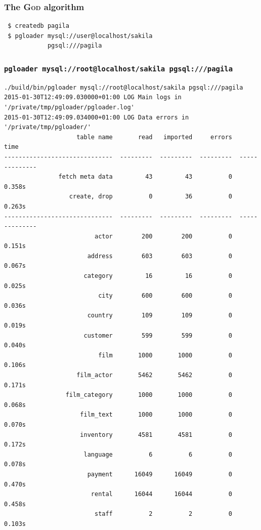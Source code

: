 \documentclass{beamer}
\begin{document}
\begin{frame}[fragile]
  \frametitle{The \textsc{God} algorithm}

  \vfill

\begin{verbatim}
 $ createdb pagila
 $ pgloader mysql://user@localhost/sakila
            pgsql:///pagila
\end{verbatim}
\end{frame}

\begin{frame}[fragile]
  \frametitle{\small{\texttt{pgloader mysql://root@localhost/sakila pgsql:///pagila}}}

\begin{Verbatim}[fontsize=\tiny]
./build/bin/pgloader mysql://root@localhost/sakila pgsql:///pagila
2015-01-30T12:49:09.030000+01:00 LOG Main logs in '/private/tmp/pgloader/pgloader.log'
2015-01-30T12:49:09.034000+01:00 LOG Data errors in '/private/tmp/pgloader/'
                    table name       read   imported     errors            time
------------------------------  ---------  ---------  ---------  --------------
               fetch meta data         43         43          0          0.358s
                  create, drop          0         36          0          0.263s
------------------------------  ---------  ---------  ---------  --------------
                         actor        200        200          0          0.151s
                       address        603        603          0          0.067s
                      category         16         16          0          0.025s
                          city        600        600          0          0.036s
                       country        109        109          0          0.019s
                      customer        599        599          0          0.040s
                          film       1000       1000          0          0.106s
                    film_actor       5462       5462          0          0.171s
                 film_category       1000       1000          0          0.068s
                     film_text       1000       1000          0          0.070s
                     inventory       4581       4581          0          0.172s
                      language          6          6          0          0.078s
                       payment      16049      16049          0          0.470s
                        rental      16044      16044          0          0.458s
                         staff          2          2          0          0.103s

\end{Verbatim}
\end{frame}
\end{document}
